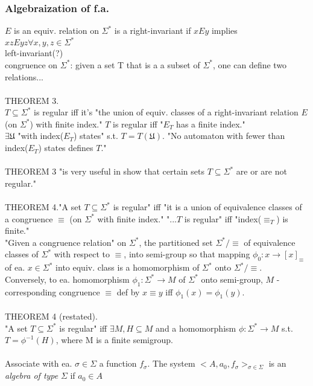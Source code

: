 \subsubsection{Algebraization of f.a.}
$E$ is an equiv. relation on $\Sigma^{*}$ is a right-invariant if $xEy$ implies $xzEyz \forall x, y, z \in \Sigma^{*}$\\
left-invariant(?)\\
congruence on $\Sigma^{*}$: given a set T that is a a subset of $\Sigma^{*}$, one can define two relations...\\
\\
THEOREM 3.\\
$T \subseteq \Sigma^{*}$ is regular iff it's "the union of equiv. classes of a right-invariant relation $E$ (on $\Sigma^{*}$) with finite index."  $T$ is regular iff "$E_{T}$ has a finite index."\\
$\exists \mathfrak{U}$ "with index($E_{T}$) states" s.t. $T = T(\mathfrak{U})$. "No automaton with fewer than index($E_{T}$) states defines $T$."\\
\\
THEOREM 3 "is very useful in show that certain sets $T \subseteq \Sigma^{*}$ are or are not regular."\\
\\
THEOREM 4."A set $T \subseteq \Sigma^{*}$ is regular" iff "it is a union of equivalence classes of a congruence $\equiv$ (on $\Sigma^{*}$ with finite index."  "...$T$ is regular" iff "index($\equiv_{T}$) is finite."\\
"Given a congruence relation" on $\Sigma^{*}$, the partitioned set $\Sigma^{*} / \equiv$ of equivalence classes of $\Sigma^{*}$ with respect to $\equiv$, into semi-group so that mapping $\phi_0 : x \to [x]_{\equiv}$  of ea. $x \in \Sigma^{*}$ into equiv. class is a homomorphism of $\Sigma^{*}$ onto $\Sigma^{*} / \equiv$.\\
Conversely, to ea. homomorphism $\phi_1 : \Sigma^{*} \to M$ of $\Sigma^{*}$ onto semi-group, $M$ - corresponding congruence $\equiv$ def by $x \equiv y$ iff $\phi_1 (x) = \phi_1 (y)$.\\
\\
THEOREM 4 (restated).\\
"A set $T \subseteq \Sigma^{*}$ is regular" iff $\exists M, H \subseteq M$ and a homomorphism $\phi : \Sigma^{*} \to M$ s.t. $T = \phi^{-1} (H)$, where M is a finite semigroup.\\
\\
Associate with ea. $\sigma \in \Sigma$ a function $f_{\sigma}$.  The system $<A, a_0, f_{\sigma}>_{\sigma \in \Sigma}$ is an \textit{algebra of type} $\Sigma$ if $a_0 \in A$


